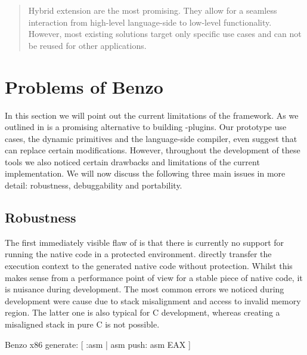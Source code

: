 \begin{quote}
Hybrid extension are the most promising.
They allow for a seamless interaction from high-level language-side to low-level functionality.
However, most existing solutions target only specific use cases and can not be reused for other applications.
\end{quote}


\section{Problems of Benzo}
In this section we will point out the current limitations of the \B framework.
As we outlined in  \B is a promising alternative to building \VM-plugins.
Our prototype use cases, the dynamic primitives and the language-side \JIT compiler, even suggest that \B can replace certain \VM modifications.
However, throughout the development of these tools we also noticed certain drawbacks and limitations of the current \B implementation.
We will now discuss the following three main issues in more detail: robustness, debuggability and portability.

\subsection{Robustness}

The first immediately visible flaw of \B is that there is currently no support for running the native code in a protected environment.
\B directly transfer the execution context to the generated native code without protection.
Whilst this makes sense from a performance point of view for a stable piece of native code, it is nuisance during development.
The most common errors we noticed during development were cause due to stack misalignment and access to invalid memory region.
The latter one is also typical for C development, whereas creating a misaligned stack in pure C is not possible.

\begin{stcode}[caption={Simple \B code possibly leading to an unbalanced stack.}]{}
Benzo x86 generate: [ :asm |
	asm push: asm EAX ]
\end{stcode}

